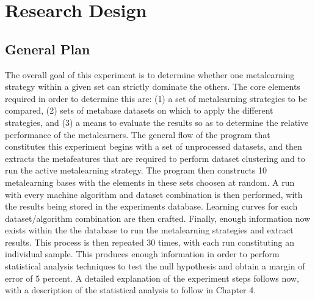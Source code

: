 \chapter{Research Design}
\label{Chapter3}
\section{General Plan}
The overall goal of this experiment is to determine whether one metalearning
strategy within a given set can strictly dominate the others. The core elements
required in order to determine this are: (1) a set of metalearning strategies to be
compared, (2) sets of metabase datasets on which to apply the different strategies,
and (3) a means to evaluate the results so as to determine the relative performance
of the metalearners. The general flow of the program that constitutes this
experiment begins with a set of unprocessed datasets, and then extracts the
metafeatures that are required to perform dataset clustering and to
run the active metalearning strategy. The program then constructs 10
metalearning bases with the elements in these sets choosen at random. A run with
every machine algorithm and dataset combination is then performed, with the
results being stored in the experiments database. Learning curves for each
dataset/algorithm combination are then crafted. Finally, enough information now
exists within the the database to run the metalearning strategies
and extract results. This process is then repeated 30 times, with each run
constituting an individual sample. This produces enough information in order
to perform statistical analysis techniques to test the null hypothesis and
obtain a margin of error of 5 percent. A detailed explanation of the experiment
steps follows now, with a description of the statistical analysis to follow in
Chapter 4.

